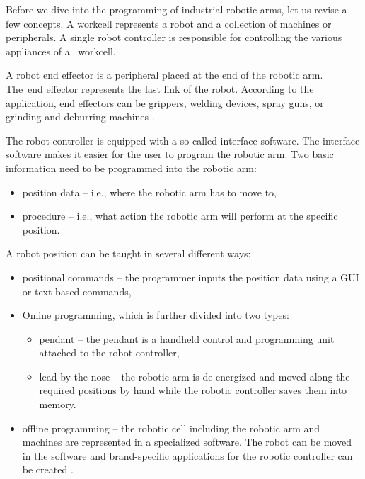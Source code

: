 Before we dive into the programming of industrial robotic arms, let us revise a few concepts.
A workcell represents a robot and a collection of machines or peripherals. A single robot controller is responsible for controlling the various appliances of a~ workcell.

A robot end effector is a peripheral placed at the end of the robotic arm. The~end effector represents the last link of the robot. According to the application, end effectors can be grippers, welding devices, spray guns, or grinding and deburring machines \cite{monkman_2007}.

The robot controller is equipped with a so-called interface software. The interface software makes it easier for the user to program the robotic arm.  
Two basic information need to be programmed into the robotic arm:

\begin{itemize}
    \item position data -- i.e., where the robotic arm has to move to,
    \item procedure -- i.e., what action the robotic arm will perform at the specific position.
\end{itemize}

A robot position can be taught in several different ways:

\begin{itemize}
    \item positional commands -- the programmer inputs the position data using a GUI or text-based commands,
    
    \item Online programming, which is further divided into two types:
    
    \begin{itemize}
    
    \item pendant -- the pendant is a handheld control and programming unit attached to the robot controller,
    \item lead-by-the-nose -- the robotic arm is de-energized and moved along the required positions by hand while the robotic controller saves them into memory.
    
    \end{itemize}
    
    \item offline programming -- the robotic cell including the robotic arm and machines are represented in a specialized software. The robot can be moved in the software and brand-specific applications for the robotic controller can be created \cite{robodkmethods}.
  

\end{itemize}

